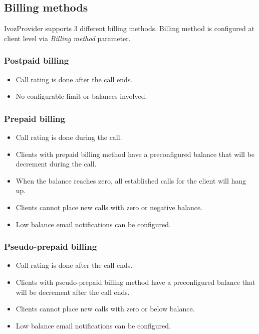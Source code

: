 \documentclass[letterpaper,10pt,english]{sphinxmanual}
\begin{document}
\subsection{Billing methods}
\label{administration_portal/brand/billing/index:billing-methods}
IvozProvider supports 3 different billing methods. Billing method is configured at client level via \emph{Billing method} parameter.


\subsubsection{Postpaid billing}
\label{administration_portal/brand/billing/index:postpaid-billing}\begin{itemize}
\item {} 
Call rating is done after the call ends.

\item {} 
No configurable limit or balances involved.

\end{itemize}


\subsubsection{Prepaid billing}
\label{administration_portal/brand/billing/index:prepaid-billing}\begin{itemize}
\item {} 
Call rating is done during the call.

\item {} 
Clients with prepaid billing method have a preconfigured balance that will be decrement during the call.

\item {} 
When the balance reaches zero, all established calls for the client will hang up.

\item {} 
Clients cannot place new calls with zero or negative balance.

\item {} 
Low balance email notifications can be configured.

\end{itemize}


\subsubsection{Pseudo-prepaid billing}
\label{administration_portal/brand/billing/index:pseudo-prepaid-billing}\begin{itemize}
\item {} 
Call rating is done after the call ends.

\item {} 
Clients with pseudo-prepaid billing method have a preconfigured balance that will be decrement after the call ends.

\item {} 
Clients cannot place new calls with zero or below balance.

\item {} 
Low balance email notifications can be configured.

\end{itemize}
\end{document}
